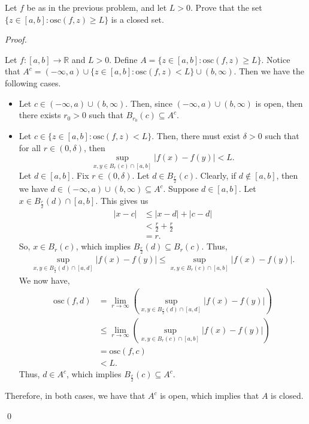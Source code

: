 \documentclass[12pt]{article}
\newenvironment{problem}[2][Problem]{\begin{trivlist}
\item[\hskip \labelsep {\bfseries #1}\hskip \labelsep {\bfseries
#2.}]}{\end{trivlist}}
\newenvironment{sol}
    {\emph{Proof.}
    }
    {
    \qed
    }
\begin{document}
  
  \begin{problem}{30}
  Let $f$ be as in the previous problem, and let $L > 0$. Prove that the set $\{z \in [a,b] : \text{osc}(f,z) \geq L \}$ is a closed set.
  \end{problem}
  \begin{sol}
  Let $f : [a,b] \to \mathbb{R}$ and $L > 0$. Define $A = \{z \in [a,b] : \text{osc}(f,z) \geq L\}$. Notice that $A^c = (-\infty,a) \cup \{z \in [a,b] : \text{osc}(f,z) < L\} \cup (b,\infty)$. Then we have the following cases.
  
  \begin{itemize}[leftmargin=.6in]
      \item[\underline{Case 1:}] Let $c \in (-\infty,a) \cup (b,\infty)$. Then, since $(-\infty,a) \cup (b,\infty)$ is open, then there exists $r_0 > 0$ such that $B_{r_0}(c) \subseteq A^c$.
      
      \item[\underline{Case 2:}] Let $c \in \{z \in [a,b] : \text{osc}(f,z) < L\}$. Then, there must exist $\delta > 0$ such that for all $r \in (0,\delta)$, then $$\sup_{x,y \in B_r(c) \cap [a,b]} \left| f(x) - f(y) \right| < L.$$ 
      Let $d \in [a,b]$. Fix $r \in (0,\delta)$. Let $d \in B_{\frac{r}{2}}(c)$. Clearly, if $d \not\in [a,b]$, then we have $d \in (-\infty, a) \cup (b,\infty) \subseteq A^c$. Suppose $d \in [a,b]$. Let $x \in B_{\frac{r}{2}}(d) \cap [a,b]$. This gives us \begin{align*}
          \left| x - c \right| &\leq \left| x - d \right| + \left| c - d \right| \tag*{(By triangle inequality)} \\
          &< \frac{r}{2} + \frac{r}{2} \\ 
          &= r.
      \end{align*}
      So, $x \in B_r(c)$, which implies $B_{\frac{r}{2}}(d) \subseteq B_r(c)$. Thus, \begin{align} \sup_{x,y \in B_{\frac{r}{2}}(d) \cap [a,d]} \left| f(x) - f(y) \right| \leq \sup_{x,y \in B_r(c) \cap [a,b]} \left| f(x) - f(y) \right|. \end{align} We now have, \begin{align*}
          \text{osc}(f,d)
          &= \lim_{r \to \infty} \left( \sup_{x,y \in B_{\frac{r}{2}}(d) \cap [a,d]} \left| f(x) - f(y) \right| \right) \tag*{(Definition of oscillation of $f$ at $d$)} \\
          &\leq \lim_{r \to \infty} \left( \sup_{x,y \in B_r(c) \cap [a,b]} \left| f(x) - f(y) \right| \right) \tag*{(By (1))} \\ 
          &= \text{osc}(f,c) \tag*{(Definition of oscillation of $f$ at $c$)} \\
          &< L.
      \end{align*}
      Thus, $d \in A^c$, which implies $B_{\frac{r}{2}}(c) \subseteq A^c$. 
  \end{itemize}
   Therefore, in both cases, we have that $A^c$ is open, which implies that $A$ is closed.
  \end{sol}
  
\end{document}
